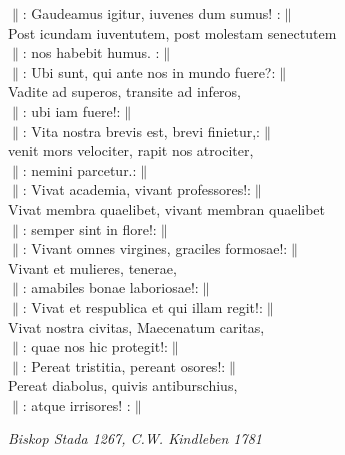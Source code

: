 \documentclass[a6paper,10pt]{article}
\begin{document}
\setlength{\oddsidemargin}{-0.37in}
\noindent
\begin{center}
\end{center}
$\|$: Gaudeamus igitur, iuvenes dum sumus! :$\|$\\
Post icundam iuventutem, post molestam senectutem\\
$\|$: nos habebit humus. :$\|$
\vspace{5pt}\\
$\|$: Ubi sunt, qui ante nos in mundo fuere?:$\|$\\
Vadite ad superos, transite ad inferos,\\
$\|$: ubi iam fuere!:$\|$
\vspace{5pt}\\
$\|$: Vita nostra brevis est, brevi finietur,:$\|$\\
venit mors velociter, rapit nos atrociter,\\
$\|$: nemini parcetur.:$\|$
\vspace{5pt}\\
$\|$: Vivat academia, vivant professores!:$\|$\\
Vivat membra quaelibet, vivant membran quaelibet\\
$\|$: semper sint in flore!:$\|$
\vspace{5pt}\\
$\|$: Vivant omnes virgines, graciles formosae!:$\|$\\
Vivant et mulieres, tenerae,\\
$\|$: amabiles bonae laboriosae!:$\|$
\vspace{5pt}\\
$\|$: Vivat et respublica et qui illam regit!:$\|$\\
Vivat nostra civitas, Maecenatum caritas,\\
$\|$: quae nos hic protegit!:$\|$
\vspace{5pt}\\
$\|$: Pereat tristitia, pereant osores!:$\|$\\
Pereat diabolus, quivis antiburschius,\\
$\|$: atque irrisores! :$\|$ 
\begin{flushright}
\textit{Biskop Stada 1267, C.W. Kindleben 1781}
\end{flushright}
\end{document}
